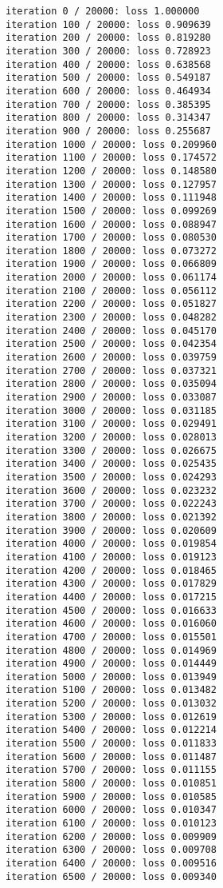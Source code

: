 \documentclass[11pt]{article}
\begin{document}
    \begin{Verbatim}[commandchars=\\\{\}]
iteration 0 / 20000: loss 1.000000
iteration 100 / 20000: loss 0.909639
iteration 200 / 20000: loss 0.819280
iteration 300 / 20000: loss 0.728923
iteration 400 / 20000: loss 0.638568
iteration 500 / 20000: loss 0.549187
iteration 600 / 20000: loss 0.464934
iteration 700 / 20000: loss 0.385395
iteration 800 / 20000: loss 0.314347
iteration 900 / 20000: loss 0.255687
iteration 1000 / 20000: loss 0.209960
iteration 1100 / 20000: loss 0.174572
iteration 1200 / 20000: loss 0.148580
iteration 1300 / 20000: loss 0.127957
iteration 1400 / 20000: loss 0.111948
iteration 1500 / 20000: loss 0.099269
iteration 1600 / 20000: loss 0.088947
iteration 1700 / 20000: loss 0.080530
iteration 1800 / 20000: loss 0.073272
iteration 1900 / 20000: loss 0.066809
iteration 2000 / 20000: loss 0.061174
iteration 2100 / 20000: loss 0.056112
iteration 2200 / 20000: loss 0.051827
iteration 2300 / 20000: loss 0.048282
iteration 2400 / 20000: loss 0.045170
iteration 2500 / 20000: loss 0.042354
iteration 2600 / 20000: loss 0.039759
iteration 2700 / 20000: loss 0.037321
iteration 2800 / 20000: loss 0.035094
iteration 2900 / 20000: loss 0.033087
iteration 3000 / 20000: loss 0.031185
iteration 3100 / 20000: loss 0.029491
iteration 3200 / 20000: loss 0.028013
iteration 3300 / 20000: loss 0.026675
iteration 3400 / 20000: loss 0.025435
iteration 3500 / 20000: loss 0.024293
iteration 3600 / 20000: loss 0.023232
iteration 3700 / 20000: loss 0.022243
iteration 3800 / 20000: loss 0.021392
iteration 3900 / 20000: loss 0.020609
iteration 4000 / 20000: loss 0.019854
iteration 4100 / 20000: loss 0.019123
iteration 4200 / 20000: loss 0.018465
iteration 4300 / 20000: loss 0.017829
iteration 4400 / 20000: loss 0.017215
iteration 4500 / 20000: loss 0.016633
iteration 4600 / 20000: loss 0.016060
iteration 4700 / 20000: loss 0.015501
iteration 4800 / 20000: loss 0.014969
iteration 4900 / 20000: loss 0.014449
iteration 5000 / 20000: loss 0.013949
iteration 5100 / 20000: loss 0.013482
iteration 5200 / 20000: loss 0.013032
iteration 5300 / 20000: loss 0.012619
iteration 5400 / 20000: loss 0.012214
iteration 5500 / 20000: loss 0.011833
iteration 5600 / 20000: loss 0.011487
iteration 5700 / 20000: loss 0.011155
iteration 5800 / 20000: loss 0.010851
iteration 5900 / 20000: loss 0.010585
iteration 6000 / 20000: loss 0.010347
iteration 6100 / 20000: loss 0.010123
iteration 6200 / 20000: loss 0.009909
iteration 6300 / 20000: loss 0.009708
iteration 6400 / 20000: loss 0.009516
iteration 6500 / 20000: loss 0.009340

\end{Verbatim}
\end{document}
